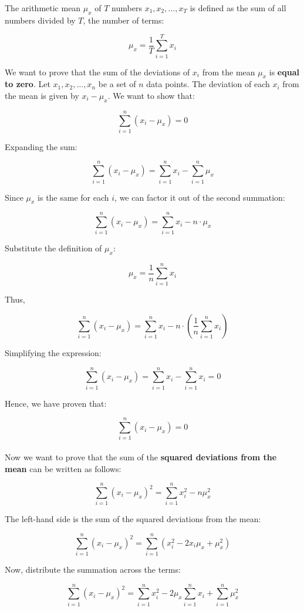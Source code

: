 \documentclass{article}
\begin{document}
The arithmetic mean $\mu_x$ of $T$ numbers $x_1, x_2, \ldots, x_T$ is defined as the sum of all numbers divided by $T$, the number of terms:

\begin{equation}
    \mu_x = \frac{1}{T} \sum_{i=1}^{T} x_i
\end{equation}


We want to prove that the sum of the deviations of $x_i$ from the mean $\mu_x$ is\textbf{ equal to zero}. Let $x_1, x_2, \dots, x_n$ be a set of $n$ data points. The deviation of each $x_i$ from the mean is given by $x_i - \mu_x$. We want to show that:

\[
\sum_{i=1}^{n} (x_i - \mu_x) = 0
\]

Expanding the sum:

\[
\sum_{i=1}^{n} (x_i - \mu_x) = \sum_{i=1}^{n} x_i - \sum_{i=1}^{n} \mu_x
\]

Since $\mu_x$ is the same for each $i$, we can factor it out of the second summation:

\[
\sum_{i=1}^{n} (x_i - \mu_x) = \sum_{i=1}^{n} x_i - n \cdot \mu_x
\]

Substitute the definition of $\mu_x$:

\[
\mu_x = \frac{1}{n} \sum_{i=1}^{n} x_i
\]

Thus,

\[
\sum_{i=1}^{n} (x_i - \mu_x) = \sum_{i=1}^{n} x_i - n \cdot \left( \frac{1}{n} \sum_{i=1}^{n} x_i \right)
\]

Simplifying the expression:

\[
\sum_{i=1}^{n} (x_i - \mu_x) = \sum_{i=1}^{n} x_i - \sum_{i=1}^{n} x_i = 0
\]

Hence, we have proven that:

\[
\sum_{i=1}^{n} (x_i - \mu_x) = 0
\] \\
Now we want to prove that the sum of the\textbf{ squared deviations from the mean} can be written as follows:

\[
\sum_{i=1}^{n} (x_i - \mu_x)^2 = \sum_{i=1}^{n} x_i^2 - n \mu_x^2
\]

The left-hand side is the sum of the squared deviations from the mean:

\[
\sum_{i=1}^{n} (x_i - \mu_x)^2 = \sum_{i=1}^{n} \left( x_i^2 - 2x_i\mu_x + \mu_x^2 \right)
\]


Now, distribute the summation across the terms:

\[
\sum_{i=1}^{n} (x_i - \mu_x)^2 = \sum_{i=1}^{n} x_i^2 - 2\mu_x \sum_{i=1}^{n} x_i + \sum_{i=1}^{n} \mu_x^2
\]
\end{document}
